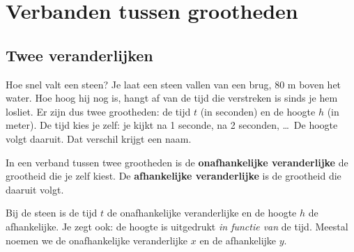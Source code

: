 \begin{oefeningen}[Start]

\end{oefeningen}

\section{Verbanden tussen grootheden}

\subsection{Twee veranderlijken}

Hoe snel valt een steen? Je laat een steen vallen van een brug, 80 m boven het water. Hoe hoog hij nog is, hangt af van de tijd die verstreken is sinds je hem losliet. Er zijn dus twee grootheden: de tijd $t$ (in seconden) en de hoogte $h$ (in meter). De tijd kies je zelf: je kijkt na 1 seconde, na 2 seconden, \ldots\ De hoogte volgt daaruit. Dat verschil krijgt een naam.

\begin{theorie}
In een verband tussen twee grootheden is de \textbf{\textcolor{accent}{onafhankelijke veranderlijke}} de grootheid die je zelf kiest. De \textbf{\textcolor{accent}{afhankelijke veranderlijke}} is de grootheid die daaruit volgt.
\end{theorie}

Bij de steen is de tijd $t$ de onafhankelijke veranderlijke en de hoogte $h$ de afhankelijke. Je zegt ook: de hoogte is uitgedrukt \textit{in functie van} de tijd. Meestal noemen we de onafhankelijke veranderlijke $x$ en de afhankelijke $y$.


\begin{oefeningen}
\end{oefeningen}

